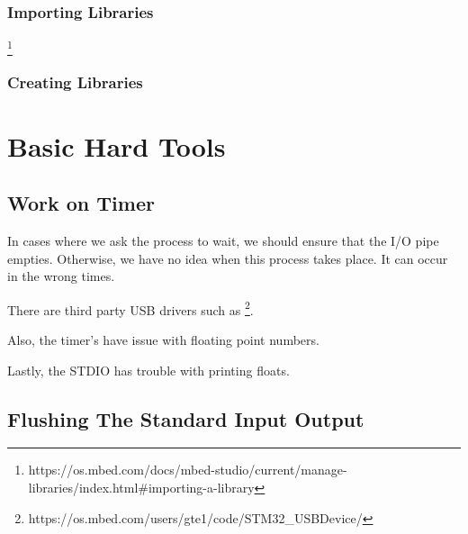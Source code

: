 \documentclass{article}
\begin{document}
\subsubsection{Importing Libraries} %
\label{ssub:importing_libraries}


\footnote{https://os.mbed.com/docs/mbed-studio/current/manage-libraries/index.html#importing-a-library}


\subsubsection{Creating Libraries} %
\label{ssub:creating_libraries}








\section{Basic Hard Tools} %
\label{sec:basic_hard_tools}

\subsection{Work on Timer} %
\label{sub:work_on_timer}

In cases where we ask the process to wait, we should ensure that the I/O pipe empties.  Otherwise, we have no idea when this process takes place.  It can occur in the wrong times.

There are third party USB drivers such as \footnote{https://os.mbed.com/users/gte1/code/STM32\_USBDevice/}.

Also, the timer's have issue with floating point numbers.

Lastly, the STDIO has trouble with printing floats.   


\subsection{Flushing The Standard Input Output} %
\label{sub:flushing_the_standard_input_output}

\end{document}
